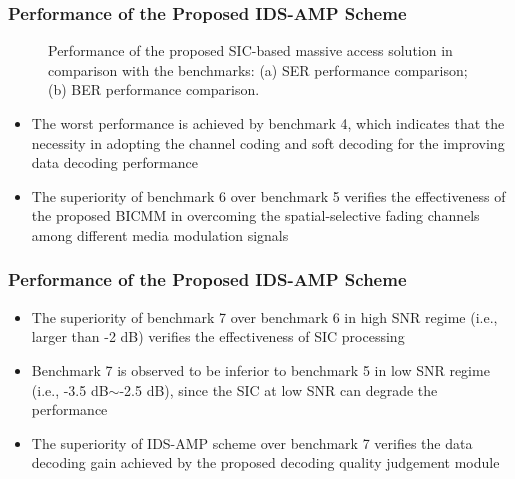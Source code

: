 \documentclass[9pt]{beamer}
\begin{document}
\begin{frame}
\frametitle{Performance of the Proposed IDS-AMP Scheme}
\begin{figure}[h]
\vspace{-8mm}
\centering
{}%
%
\centering
\setlength{\abovecaptionskip}{-1mm}
\caption{Performance of the proposed SIC-based massive access solution in comparison with the benchmarks: (a) SER performance comparison; (b) BER performance comparison.}
\label{fig:SNRcoded}
\end{figure}
\begin{itemize}
\item
The worst performance is achieved by benchmark 4, which indicates that the necessity in adopting the channel coding and soft decoding for the improving data decoding performance
\item
The superiority of benchmark 6 over benchmark 5 verifies the effectiveness of the proposed BICMM in overcoming the spatial-selective fading channels among different media modulation signals

\end{itemize}
\end{frame}

\begin{frame}
\frametitle{Performance of the Proposed IDS-AMP Scheme}
\begin{itemize}
\item
The superiority of benchmark 7 over benchmark 6 in high SNR regime (i.e., larger than -2 dB) verifies the effectiveness of SIC processing
\item
Benchmark 7 is observed to be inferior to benchmark 5 in low SNR regime (i.e., -3.5 dB$\sim$-2.5 dB), since the SIC at low SNR can degrade the performance
\item
The superiority of IDS-AMP scheme over benchmark 7 verifies the data decoding gain achieved by the proposed decoding quality judgement module
\end{itemize}
\end{frame}
\end{document}
